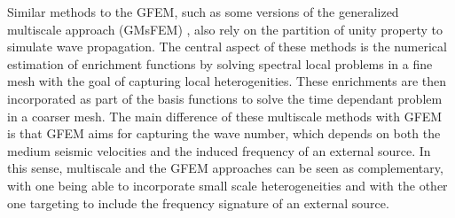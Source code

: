 Similar methods to the GFEM, such as some versions of the generalized multiscale approach (GMsFEM) \cite{Gao2015,Jiang2010}, also rely on the partition of unity property to simulate wave propagation. The central aspect of these methods is the numerical estimation of enrichment functions by solving spectral local problems in a fine mesh with the goal of capturing local heterogenities. These enrichments are then incorporated as part of the basis functions to solve the time dependant problem in a coarser mesh. The main difference  of these multiscale methods with GFEM  is that GFEM aims for capturing the wave number, which depends on both  the medium seismic velocities and the induced frequency of an external source. In this sense, multiscale and the GFEM approaches can be seen as complementary, with one being able to  incorporate small scale heterogeneities and with the other one targeting to include the frequency signature of an external source.


